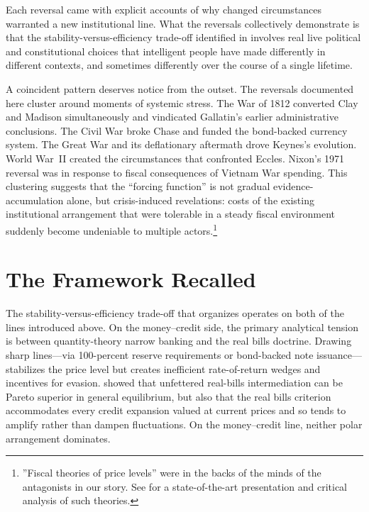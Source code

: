 \documentclass[12pt]{article}
\begin{document}
Each reversal came with explicit accounts of why changed circumstances
warranted a new institutional line.  What the reversals collectively demonstrate is that
the stability-versus-efficiency trade-off identified in
\citet{Sargent2011} involves real
live political and constitutional choices that intelligent people have made differently in different contexts, and sometimes  differently over
the course of a single lifetime.

A coincident pattern deserves notice from the outset.  The
reversals documented here cluster around moments of systemic stress.  The
War of 1812 converted Clay and Madison simultaneously and vindicated
Gallatin's earlier administrative conclusions.  The Civil War broke
Chase and funded the bond-backed currency system.  The Great War and its
deflationary aftermath drove Keynes's evolution.  World War~II created
the circumstances that confronted  Eccles.  Nixon's 1971 reversal was in response to  fiscal consequences of Vietnam War spending.  This clustering
suggests that the ``forcing function'' is not gradual evidence-accumulation
alone, but crisis-induced revelations: costs of the existing
institutional arrangement that were tolerable in a steady fiscal
environment suddenly become undeniable to multiple actors.\footnote{''Fiscal theories of price levels'' were in the backs
of the minds of the antagonists in our story. See \citet{Cochrane2023} for a state-of-the-art presentation and critical analysis of such theories.}


\section{The Framework Recalled}

The stability-versus-efficiency trade-off that organizes \citet{Sargent2011}
operates on both of the lines introduced above.  On the money--credit side,
the primary analytical tension is between quantity-theory narrow banking and
the real bills doctrine.  Drawing sharp lines---via 100-percent reserve
requirements or bond-backed note issuance---stabilizes the price level but
creates inefficient rate-of-return wedges and incentives for evasion.
\citet{SargentWallace1982} showed that unfettered real-bills intermediation
can be Pareto superior in general equilibrium, but also that the real bills
criterion accommodates every credit expansion valued at current prices and
so tends to amplify rather than dampen fluctuations.  On the money--credit
line, neither polar arrangement dominates.
\end{document}
